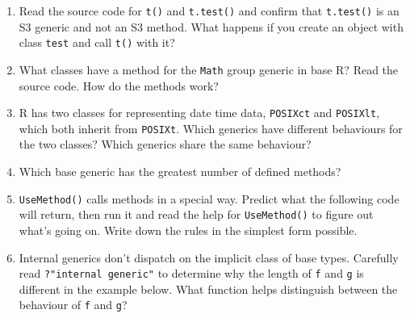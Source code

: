 \begin{enumerate}
\def\labelenumi{\arabic{enumi}.}
\item
  Read the source code for \texttt{t()} and \texttt{t.test()} and
  confirm that \texttt{t.test()} is an S3 generic and not an S3 method.
  What happens if you create an object with class \texttt{test} and call
  \texttt{t()} with it?
\item
  What classes have a method for the \texttt{Math} group generic in base
  R? Read the source code. How do the methods work?
\item
  R has two classes for representing date time data, \texttt{POSIXct}
  and \texttt{POSIXlt}, which both inherit from \texttt{POSIXt}. Which
  generics have different behaviours for the two classes? Which generics
  share the same behaviour?
\item
  Which base generic has the greatest number of defined methods?
\item
  \texttt{UseMethod()} calls methods in a special way. Predict what the
  following code will return, then run it and read the help for
  \texttt{UseMethod()} to figure out what's going on. Write down the
  rules in the simplest form possible.

\begin{Shaded}
\begin{Highlighting}[]
\StringTok{ }
\StringTok{ }
\StringTok{ }
  \NormalTok{(}\NormalTok{)}
\NormalTok{\}}
\StringTok{ }
\NormalTok{(}\NormalTok{)}

\StringTok{ }
\StringTok{ }
  \NormalTok{(}\NormalTok{)}
\NormalTok{\}}
\StringTok{ }\NormalTok{(}
\StringTok{ }\NormalTok{(}

\NormalTok{(}\NormalTok{)}
\end{Highlighting}
\end{Shaded}
\item
  Internal generics don't dispatch on the implicit class of base types.
  Carefully read \texttt{?"internal\ generic"} to determine why the
  length of \texttt{f} and \texttt{g} is different in the example below.
  What function helps distinguish between the behaviour of \texttt{f}
  and \texttt{g}?


\end{enumerate}

